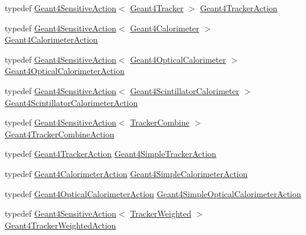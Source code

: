 \begin{DoxyCompactItemize}
\item 
typedef \hyperlink{class_d_d4hep_1_1_simulation_1_1_geant4_sensitive_action}{Geant4SensitiveAction}$<$ \hyperlink{class_d_d4hep_1_1_simulation_1_1_geant4_tracker}{Geant4Tracker} $>$ \hyperlink{namespace_d_d4hep_1_1_simulation_abb17b973f2ae551abf2c7662d5c05e12}{Geant4TrackerAction}
\item 
typedef \hyperlink{class_d_d4hep_1_1_simulation_1_1_geant4_sensitive_action}{Geant4SensitiveAction}$<$ \hyperlink{class_d_d4hep_1_1_simulation_1_1_geant4_calorimeter}{Geant4Calorimeter} $>$ \hyperlink{namespace_d_d4hep_1_1_simulation_af49169edf9a8a04f3255a2b126698128}{Geant4CalorimeterAction}
\item 
typedef \hyperlink{class_d_d4hep_1_1_simulation_1_1_geant4_sensitive_action}{Geant4SensitiveAction}$<$ \hyperlink{struct_d_d4hep_1_1_simulation_1_1_geant4_optical_calorimeter}{Geant4OpticalCalorimeter} $>$ \hyperlink{namespace_d_d4hep_1_1_simulation_a9b4de3b53a0e39ec195ab057b9b3b971}{Geant4OpticalCalorimeterAction}
\item 
typedef \hyperlink{class_d_d4hep_1_1_simulation_1_1_geant4_sensitive_action}{Geant4SensitiveAction}$<$ \hyperlink{struct_d_d4hep_1_1_simulation_1_1_geant4_scintillator_calorimeter}{Geant4ScintillatorCalorimeter} $>$ \hyperlink{namespace_d_d4hep_1_1_simulation_a518721ad629e0c574145b27d7e1e0c36}{Geant4ScintillatorCalorimeterAction}
\item 
typedef \hyperlink{class_d_d4hep_1_1_simulation_1_1_geant4_sensitive_action}{Geant4SensitiveAction}$<$ \hyperlink{struct_d_d4hep_1_1_simulation_1_1_tracker_combine}{TrackerCombine} $>$ \hyperlink{namespace_d_d4hep_1_1_simulation_ae4372869044729bc07b6343c4e077fdc}{Geant4TrackerCombineAction}
\item 
typedef \hyperlink{class_d_d4hep_1_1_simulation_1_1_geant4_sensitive_action}{Geant4TrackerAction} \hyperlink{namespace_d_d4hep_1_1_simulation_a6f4f8c57d8b3239f579f31519e803afa}{Geant4SimpleTrackerAction}
\item 
typedef \hyperlink{class_d_d4hep_1_1_simulation_1_1_geant4_sensitive_action}{Geant4CalorimeterAction} \hyperlink{namespace_d_d4hep_1_1_simulation_a567bbed97768b8a89f60e745b6d3dd51}{Geant4SimpleCalorimeterAction}
\item 
typedef \hyperlink{class_d_d4hep_1_1_simulation_1_1_geant4_sensitive_action}{Geant4OpticalCalorimeterAction} \hyperlink{namespace_d_d4hep_1_1_simulation_a3017d956ee0a02d03e54c12486dd9230}{Geant4SimpleOpticalCalorimeterAction}
\item 
typedef \hyperlink{class_d_d4hep_1_1_simulation_1_1_geant4_sensitive_action}{Geant4SensitiveAction}$<$ \hyperlink{struct_d_d4hep_1_1_simulation_1_1_tracker_weighted}{TrackerWeighted} $>$ \hyperlink{namespace_d_d4hep_1_1_simulation_a63833833f53787d1116da0c3bb635dc8}{Geant4TrackerWeightedAction}

\end{DoxyCompactItemize}
